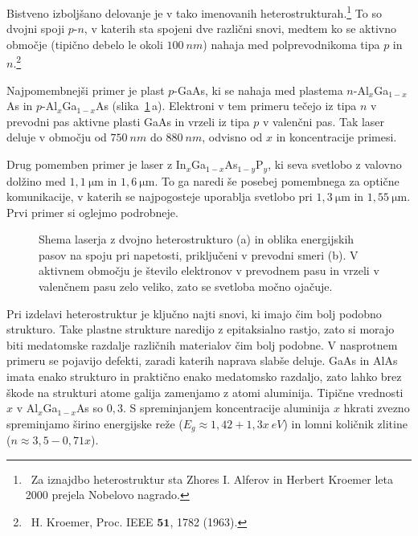 Bistveno izboljšano delovanje je v tako imenovanih 
heterostrukturah.\footnote{~Za 
iznajdbo heterostruktur sta Zhores I. Alferov in Herbert Kroemer leta 2000 prejela Nobelovo nagrado.}
 To so dvojni spoji $p$-$n$, 
v katerih sta spojeni dve različni snovi, medtem ko se aktivno območje (tipično debelo le okoli $100~\si{nm}$) 
nahaja med polprevodnikoma tipa $p$ in $n$.\footnote{~H. Kroemer, Proc. IEEE $\mathbf{51}$, 1782 (1963).}

Najpomembnejši primer je plast $p$-GaAs, ki se nahaja med plastema  
$n$-Al$_x$Ga$_{1-x}$As in $p$-Al$_x$Ga$_{1-x}$As 
(slika~\ref{fig:hetero}\,a). Elektroni v tem primeru tečejo iz tipa $n$ v prevodni pas aktivne plasti
GaAs in vrzeli iz tipa $p$ v valenčni pas. 
Tak laser deluje v območju od $750~\si{nm}$ do $880~\si{nm}$, odvisno od $x$ in koncentracije primesi.

Drug pomemben primer je laser z In$_{x}$Ga$_{1-x}$As$_{1-y}$P$_y$, ki seva svetlobo z valovno 
dolžino med $1,1~\si{\micro\metre}$ in $1,6~\si{\micro\metre}$. To ga naredi še posebej pomembnega za optične
komunikacije, v katerih se najpogosteje uporablja svetlobo pri $1,3~\si{\micro\meter}$ in $1,55~\si{\micro\meter}$. 
Prvi primer si oglejmo podrobneje.
\begin{figure}[ht]
\centering
\def\svgwidth{128truemm} 

\caption{Shema laserja z dvojno heterostrukturo (a) in oblika energijskih pasov 
na spoju pri napetosti, priključeni v prevodni smeri (b). V aktivnem območju
je število elektronov v prevodnem pasu in vrzeli v valenčnem pasu zelo veliko, zato se 
svetloba močno ojačuje.
}
\label{fig:hetero}
\end{figure}
\begin{remark}
Pri izdelavi heterostruktur je ključno najti snovi, ki imajo čim bolj podobno strukturo.
Take plastne strukture naredijo z epitaksialno rastjo, zato si morajo biti medatomske
razdalje različnih materialov čim bolj podobne. V nasprotnem primeru se pojavijo 
defekti, zaradi katerih naprava slabše deluje. 
GaAs in AlAs imata enako strukturo in praktično enako medatomsko razdaljo, zato 
lahko brez škode na strukturi atome galija zamenjamo z atomi aluminija. Tipične 
vrednosti $x$ v Al$_x$Ga$_{1-x}$As so $0,3$. S spreminjanjem koncentracije aluminija $x$ hkrati
zvezno spreminjamo širino energijske reže ($E_g \approx 1,42 + 1,3x~\si{eV}$) in lomni količnik 
zlitine ($n \approx 3,5-0,71x$).
\end{remark}

